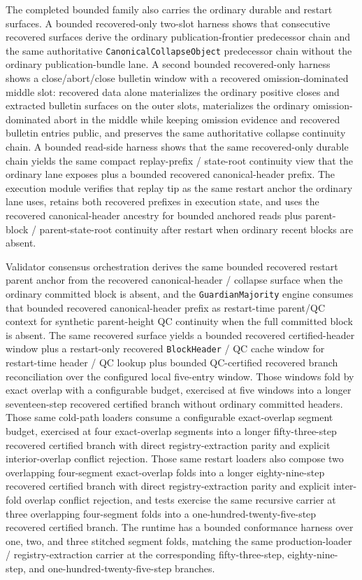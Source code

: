 \documentclass[11pt]{article}
\newcommand{\code}[1]{\texttt{#1}}
\begin{document}
The completed bounded family also carries the ordinary durable and restart
surfaces. A bounded recovered-only two-slot harness shows that consecutive
recovered surfaces derive the ordinary publication-frontier predecessor chain
and the same authoritative \code{CanonicalCollapseObject} predecessor chain
without the ordinary publication-bundle lane. A second bounded recovered-only
harness shows a close/abort/close bulletin window with a recovered
omission-dominated middle slot: recovered data alone materializes the ordinary
positive closes and extracted bulletin surfaces on the outer slots,
materializes the ordinary omission-dominated abort in the middle while keeping
omission evidence and recovered bulletin entries public, and preserves the same
authoritative collapse continuity chain. A bounded read-side harness shows that
the same recovered-only durable chain yields the same compact replay-prefix /
state-root continuity view that the ordinary lane exposes plus a bounded
recovered canonical-header prefix. The execution module verifies that replay
tip as the same restart anchor the ordinary lane uses, retains both recovered
prefixes in execution state, and uses the recovered canonical-header ancestry
for bounded anchored reads plus parent-block / parent-state-root continuity
after restart when ordinary recent blocks are absent.

Validator consensus orchestration derives the same bounded recovered restart
parent anchor from the recovered canonical-header / collapse surface when the
ordinary committed block is absent, and the \code{GuardianMajority} engine
consumes that bounded recovered canonical-header prefix as restart-time
parent/QC context for synthetic parent-height QC continuity when the full
committed block is absent. The same recovered surface yields a bounded
recovered certified-header window plus a restart-only recovered
\code{BlockHeader} / QC cache window for restart-time header / QC lookup plus
bounded QC-certified recovered branch reconciliation over the configured local
five-entry window. Those windows fold by exact overlap with a configurable
budget, exercised at five windows into a longer seventeen-step recovered
certified branch without ordinary committed headers. Those same cold-path
loaders consume a configurable exact-overlap segment budget, exercised at four
exact-overlap segments into a longer fifty-three-step recovered certified
branch with direct registry-extraction parity and explicit interior-overlap
conflict rejection. Those same restart loaders also compose two overlapping
four-segment exact-overlap folds into a longer eighty-nine-step recovered
certified branch with direct registry-extraction parity and explicit inter-fold
overlap conflict rejection, and tests exercise the same recursive carrier at
three overlapping four-segment folds into a one-hundred-twenty-five-step
recovered certified branch. The runtime has a bounded conformance harness over
one, two, and three stitched segment folds, matching the same production-loader
/ registry-extraction carrier at the corresponding fifty-three-step,
eighty-nine-step, and one-hundred-twenty-five-step branches.
\end{document}
